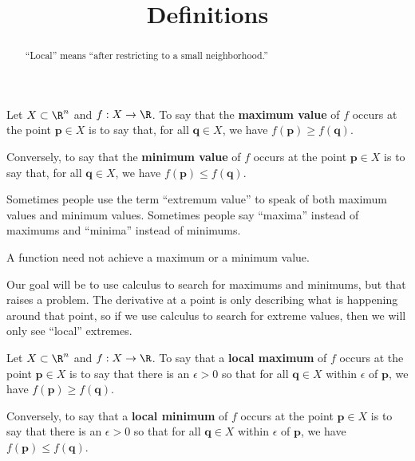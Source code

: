 \documentclass{ximera}
\title{Definitions}
\begin{document}
\begin{abstract}
  ``Local'' means ``after restricting to a small neighborhood.''
\end{abstract}

\begin{definition}
  Let $X \subset \R^n$ and $f : X \to \R$.  To say that the
  \textbf{maximum value} of $f$ occurs at the point $\mathbf{p} \in X$
  is to say that, for all $\mathbf{q} \in X$, we have $f(\mathbf{p})
  \geq f(\mathbf{q})$.

  Conversely, to say that the \textbf{minimum value} of $f$ occurs at
  the point $\mathbf{p} \in X$ is to say that, for all $\mathbf{q} \in
  X$, we have $f(\mathbf{p}) \leq f(\mathbf{q})$.

  Sometimes people use the term ``extremum value'' to speak of both
  maximum values and minimum values.  Sometimes people say ``maxima''
  instead of maximums and ``minima'' instead of minimums.
\end{definition}

A function need not achieve a maximum or a minimum value.

Our goal will be to use calculus to search for maximums and minimums,
but that raises a problem.  The derivative at a point is only
describing what is happening around that point, so if we use calculus
to search for extreme values, then we will only see ``local''
extremes.

\begin{definition}
  Let $X \subset \R^n$ and $f : X \to \R$.  To say that a
  \textbf{local maximum} of $f$ occurs at the point $\mathbf{p} \in X$
  is to say that there is an $\epsilon > 0$ so that for all
  $\mathbf{q} \in X$ within $\epsilon$ of $\mathbf{p}$, we have
  $f(\mathbf{p}) \geq f(\mathbf{q})$.

  Conversely, to say that a \textbf{local minimum} of $f$ occurs at
  the point $\mathbf{p} \in X$ is to say that there is an $\epsilon >
  0$ so that for all $\mathbf{q} \in X$ within $\epsilon$ of
  $\mathbf{p}$, we have $f(\mathbf{p}) \leq f(\mathbf{q})$.
\end{definition}
\end{document}

